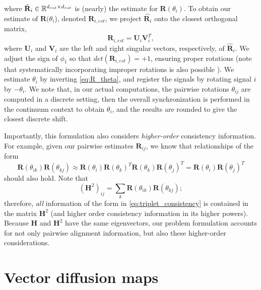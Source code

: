 where $\hat{\mathbf{R}}_i \in \mathbb{R}^{d_{rot} \times d_{rot}}$ is (nearly) the estimate for $\mathbf{R}(\theta_i)$.
%
To obtain our estimate of $\mathbf{R}(\theta_i$), denoted $\mathbf{R}_{i, est}$, we project $\hat{\mathbf{R}}_i$ onto the closest orthogonal matrix,
\begin{equation} \label{eq:R_est}
\mathbf{R}_{i, est} = \mathbf{U}_i \mathbf{V}_i^T,
\end{equation}
where $\mathbf{U}_i$ and $\mathbf{V}_i$ are the left and right singular vectors, respectively, of $\hat{\mathbf{R}}_i$.
%
We adjust the sign of $\phi_1$ so that $det(\mathbf{R}_{i, est}) = +1$, ensuring proper rotations 
(note that systematically incorporating improper rotations is also possible \citep{goemans1995improved, bandeira2013cheeger}).
%
We estimate $\theta_{i}$ by inverting \eqref{eq:R_theta}, and register the signals by rotating signal $i$ by $-\theta_i$.
%
We note that, in our actual computations, the pairwise rotations $\theta_{ij}$ are computed in a discrete setting, then the overall
synchronization is performed in the continuum context to obtain $\theta_i$, and the results are rounded to give the closest
discrete shift.

Importantly, this formulation also considers {\it higher-order} consistency information.
%
For example, given our pairwise estimates $\mathbf{R}_{ij}$, we know that relationships of the form
\begin{equation} \label{eq:triplet_consistency}
\mathbf{R}(\theta_{ik}) \mathbf{R}(\theta_{kj}) \approx \mathbf{R}(\theta_i) \mathbf{R}(\theta_k)^T \mathbf{R}(\theta_k) \mathbf{R}(\theta_j)^T = \mathbf{R}(\theta_i) \mathbf{R}(\theta_j)^T
\end{equation}
should also hold.
%
Note that
\begin{equation}
(\mathbf{H}^2)_{ij} = \sum_k \mathbf{R}(\theta_{ik}) \mathbf{R}(\theta_{kj});
\end{equation}
therefore, {\it all} information of the form in \eqref{eq:triplet_consistency} is contained in the matrix $\mathbf{H}^2$ (and higher order
consistency information in its higher powers).
%
Because $\mathbf{H}$ and $\mathbf{H}^2$ have the same eigenvectors, our problem formulation accounts for not only pairwise alignment information, but also these higher-order considerations.

\section{Vector diffusion maps}

